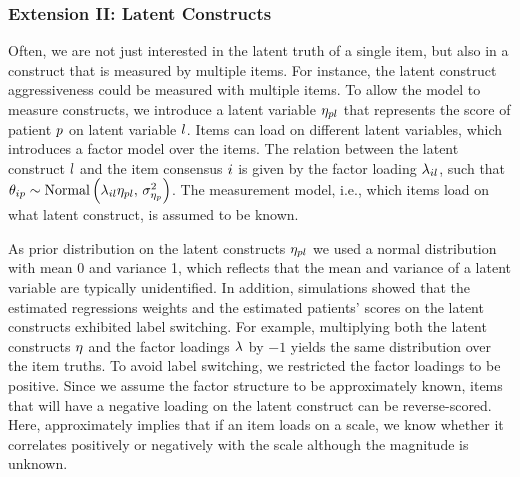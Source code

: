 \documentclass[a4paper,usenames,dvipsnames]{article}
\newenvironment{revision}{\color{black}}{\color{black}}
\begin{document}
\subsubsection*{Extension II: Latent Constructs}
Often, we are not just interested in the latent truth of a single item, but also in a construct that is measured by multiple items. For instance, the latent construct aggressiveness could be measured with multiple items. To allow the model to measure constructs, we introduce a latent variable $\eta_{pl}$ that represents the score of patient $p$ on latent variable $l$. Items can load on different latent variables, which introduces a factor model over the items. The relation between the latent construct $l$ and the item consensus $i$ is given by the factor loading $\lambda_{il}$, such that $\theta_{ip} \sim \text{Normal}\left(\lambda_{il}\eta_{pl},\,\sigma^2_{\eta_{p}}\right)$. The measurement model, i.e., which items load on what latent construct, is assumed to be known.

As prior distribution on the latent constructs $\eta_{pl}$ we used a normal distribution with mean 0 and variance 1, which reflects that the mean and variance of a latent variable are typically  unidentified. In addition, simulations showed that the estimated regressions weights and the estimated patients' scores on the latent constructs exhibited label switching. For example, multiplying both the latent constructs $\eta$ and the factor loadings $\lambda$ by $-1$ yields the same distribution over the item truths. To avoid label switching, we restricted the factor loadings to be positive. Since we assume the factor structure to be approximately known, items that will have a negative loading on the latent construct can \protect\begin{revision}be\protect\end{revision} reverse-scored. Here, approximately implies that if an item loads on a scale, we know whether it correlates positively or negatively with the scale although the magnitude is unknown.
\end{document}
